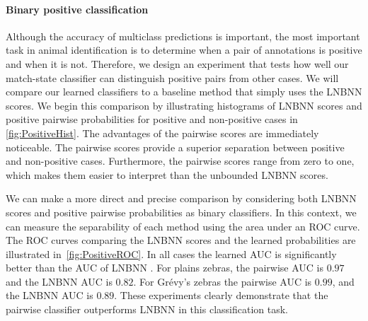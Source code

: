         \paragraph{Binary positive classification}
        Although the accuracy of multiclass predictions is important, the most important task in animal
          identification is to determine when a pair of annotations is positive and when it is not.
        Therefore, we design an experiment that tests how well our match-state classifier can distinguish
          positive pairs from other cases.
        We will compare our learned classifiers to a baseline method that simply uses the LNBNN scores.
        We begin this comparison by illustrating histograms of LNBNN scores and positive pairwise probabilities
          for positive and non-positive cases in \cref{fig:PositiveHist}.
        The advantages of the pairwise scores are immediately noticeable.
        The pairwise scores provide a superior separation between positive and non-positive cases.
        Furthermore, the pairwise scores range from zero to one, which makes them easier to interpret than the
          unbounded LNBNN scores.


        We can make a more direct and precise comparison by considering both LNBNN scores and positive pairwise
          probabilities as binary classifiers.
        In this context, we can measure the separability of each method using the area under an ROC curve.
        The ROC curves comparing the LNBNN scores and the learned probabilities are illustrated
          in~\cref{fig:PositiveROC}.
        In all cases the learned AUC is significantly better than the AUC of LNBNN .
        For plains zebras, the pairwise AUC is $0.97$ and the LNBNN AUC is $0.82$.
        For Grévy's zebras the pairwise AUC is $0.99$, and the LNBNN AUC is $0.89$.
        These experiments clearly demonstrate that the pairwise classifier outperforms LNBNN in this
          classification task.

